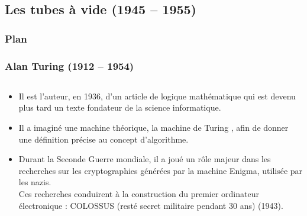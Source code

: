 \documentclass[utf8,10pt]{beamer}
\begin{document}
\subsection{Les tubes à vide (1945 -- 1955)}

\begin{frame}

	\frametitle{Plan}
	
	\tableofcontents[currentsubsection]
\end{frame}

\begin{frame}
    \frametitle{Alan Turing (1912 -- 1954)}
    \begin{columns}
    \begin{column}{0.65\textwidth}
     \begin{itemize}
        \item Il est l'auteur, en 1936, d'un article de logique mathématique qui est devenu plus tard un 
        texte fondateur de la science informatique.
        \item Il a imaginé une machine théorique, la \og machine de Turing \fg, afin de donner une définition 
        précise au concept d’algorithme.
        \item Durant la Seconde Guerre mondiale, il a joué un rôle majeur dans les recherches sur les 
        cryptographies générées par la machine \alert{Enigma}, utilisée par les nazis.\\ Ces recherches
        conduirent à la construction du premier ordinateur électronique : \alert{COLOSSUS} (resté secret
        militaire pendant 30 ans) (1943).
        
        \hfill \hyperlink{http://fr.wikipedia.org/wiki/Alan_Turing}{}
     \end{itemize}
    \end{column}
    

\end{columns}
\end{frame}
\end{document}
